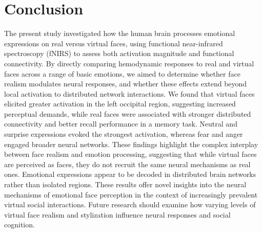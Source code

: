\section{Conclusion}
The present study investigated how the human brain processes emotional expressions on real versus virtual faces, using functional near-infrared spectroscopy (fNIRS) to assess both activation magnitude and functional connectivity. 
By directly comparing hemodynamic responses to real and virtual faces across a range of basic emotions, we aimed to determine whether face realism modulates neural responses, and whether these effects extend beyond local activation to distributed network interactions. 
We found that virtual faces elicited greater activation in the left occipital region, suggesting increased perceptual demands, while real faces were associated with stronger distributed connectivity and better recall performance in a memory task. 
Neutral and surprise expressions evoked the strongest activation, whereas fear and anger engaged broader neural networks. 
These findings highlight the complex interplay between face realism and emotion processing, suggesting that while virtual faces are perceived as faces, they do not recruit the same neural mechanisms as real ones. 
Emotional expressions appear to be decoded in distributed brain networks rather than isolated regions. 
These results offer novel insights into the neural mechanisms of emotional face perception in the context of increasingly prevalent virtual social interactions. 
Future research should examine how varying levels of virtual face realism and stylization influence neural responses and social cognition.